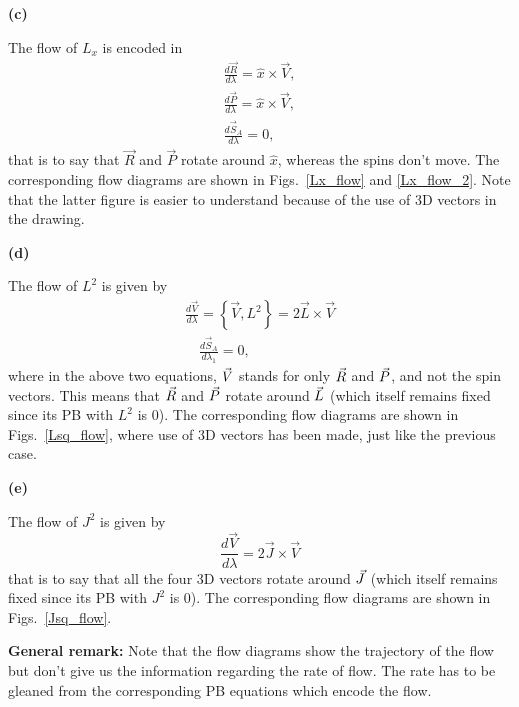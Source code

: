 \begin{Exercise}
\textbf{(c)}

The flow of $L_x$ is encoded in 
\begin{align}
\frac{d \vec{R}}{d \lambda}=\hat{x} \times \vec{V},   \\
\frac{d \vec{P}}{d \lambda}=\hat{x} \times \vec{V},     \\
\frac{d \vec{S}_A}{d \lambda}=  0,   
\end{align}
that is to say that $\vec{R}$ and $\vec{P}$ rotate around $\hat{x}$,
whereas the spins don't move.
The  corresponding flow diagrams are shown in
Figs.~\ref{Lx_flow} and \ref{Lx_flow_2}. Note that the latter figure
is easier to understand because of the use of 3D vectors in the
drawing.






\textbf{(d)}

The flow of $L^2$ is given by
\begin{align}
\frac{d \vec{V}}{d \lambda}=\left\{\vec{V}, L^{2}\right\}=2 \vec{L} \times \vec{V}  \\ 
\quad \frac{d \vec{S}_{A}}{d \lambda_{1}}=0,
\end{align}
where in the above two equations, $\vec{V}$ stands for only
$\vec{R}$ and $\vec{P}$, and not the spin vectors.
This means that $\vec{R}$ and $\vec{P}$
rotate around $\vec{L}$ (which itself remains fixed since its PB
with $L^2$ is 0).
The  corresponding flow diagrams are shown in
Figs.~\ref{Lsq_flow}, where use of 3D vectors has been made, just like the 
previous case.





\textbf{(e)}

The flow of $J^2$ is given by
\begin{equation}
\frac{d \vec{V}}{d \lambda}=2 \vec{J} \times \vec{V}
\end{equation}
that is to say that all the four 3D vectors
rotate around $\vec{J}$ (which itself remains fixed since its PB
with $J^2$ is 0).
The corresponding flow diagrams are shown in
Figs.~\ref{Jsq_flow}.


\textbf{General remark:} Note that the flow diagrams show the trajectory 
of the flow but don't give us the information regarding 
the rate of flow. The rate has to be gleaned from the 
corresponding PB equations which encode the flow.


\end{Exercise}





